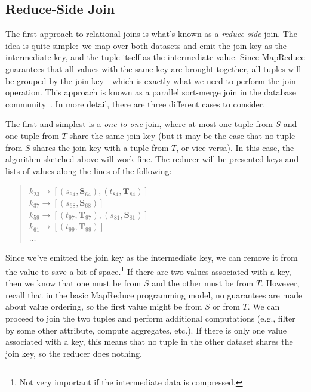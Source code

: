 \subsection{Reduce-Side Join}

The first approach to relational joins is what's known as a {\it
  reduce-side} join.  The idea is quite simple:\ we map over both
datasets and emit the join key as the intermediate key, and the tuple
itself as the intermediate value.  Since MapReduce guarantees that all
values with the same key are brought together, all tuples will be
grouped by the join key---which is exactly what we need to perform the
join operation.  This approach is known as a parallel sort-merge join
in the database community~\cite{Schneider_DeWitt_SIGMOD1989}.  In more
detail, there are three different cases to consider.

The first and simplest is a {\it one-to-one} join, where at most one
tuple from $S$ and one tuple from $T$ share the same join key (but
it may be the case that no tuple from $S$ shares the join key with a
tuple from $T$, or vice versa).  In this case, the algorithm sketched
above will work fine.  The reducer will be presented keys and lists of
values along the lines of the following:

\begin{quote}
$k_{23} \rightarrow [ (s_{64}, \textbf{S}_{64}), (t_{84}, \textbf{T}_{84}) ]$ \\
$k_{37} \rightarrow [ (s_{68}, \textbf{S}_{68}) ]$ \\
$k_{59} \rightarrow [ (t_{97}, \textbf{T}_{97}), (s_{81}, \textbf{S}_{81}) ]$ \\
$k_{61} \rightarrow [ (t_{99}, \textbf{T}_{99}) ]$ \\
$\ldots$
\end{quote}

\noindent Since we've emitted the join key as the intermediate key, we
can remove it from the value to save a bit of space.\footnote{Not very
  important if the intermediate data is compressed.}  If there are two
values associated with a key, then we know that one must be from $S$
and the other must be from $T$.  However, recall that in the basic
MapReduce programming model, no guarantees are made about value
ordering, so the first value might be from $S$ or from $T$.  We can
proceed to join the two tuples and perform additional computations
(e.g., filter by some other attribute, compute aggregates, etc.).  If
there is only one value associated with a key, this means that no
tuple in the other dataset shares the join key, so the reducer does
nothing.

